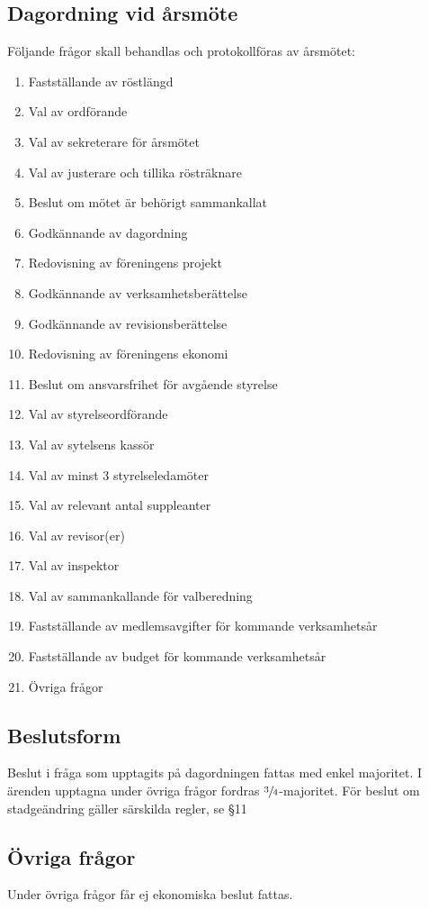 \documentclass[11pt,a4paper]{article}
\begin{document}
\subsection{Dagordning vid årsmöte}
Följande frågor skall behandlas och protokollföras av årsmötet:
\begin{enumerate}
\item Fastställande av röstlängd
\item Val av ordförande
\item Val av sekreterare för årsmötet
\item Val av justerare och tillika rösträknare
\item Beslut om mötet är behörigt sammankallat
\item Godkännande av dagordning
\item Redovisning av föreningens projekt
\item Godkännande av verksamhetsberättelse
\item Godkännande av revisionsberättelse
\item Redovisning av föreningens ekonomi
\item Beslut om ansvarsfrihet för avgående styrelse
\item Val av styrelseordförande
\item Val av sytelsens kassör
\item Val av minst 3 styrelseledamöter
\item Val av relevant antal suppleanter
\item Val av revisor(er)
\item Val av inspektor
\item Val av sammankallande för valberedning
\item Fastställande av medlemsavgifter för kommande verksamhetsår
\item Fastställande av budget för kommande verksamhetsår
\item Övriga frågor
\end{enumerate}
\subsection{Beslutsform}
Beslut i fråga som upptagits på dagordningen fattas med enkel majoritet. I
ärenden upptagna under övriga frågor fordras \(\sfrac{3}{4}\)-majoritet. För beslut om stadgeändring gäller särskilda regler, se \S11
\subsection{Övriga frågor}
Under övriga frågor får ej ekonomiska beslut fattas.
\end{document}
